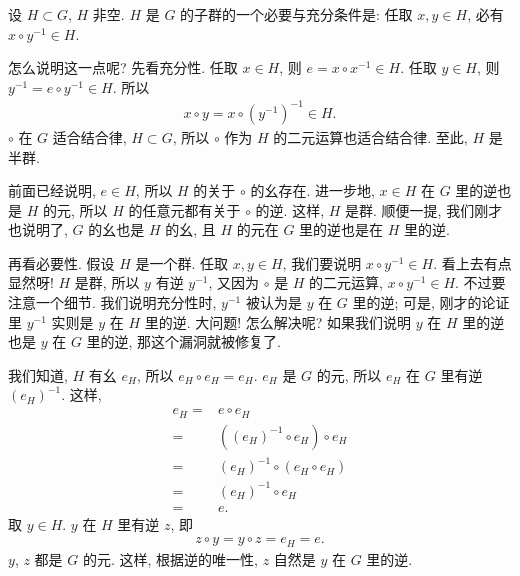 \begin{remark}
    设 $H \subset G$, $H$ 非空. $H$ 是 $G$ 的子群的一个必要与充分条件是: 任取 $x,y \in H$, 必有 $x \circ y^{-1} \in H$.

    怎么说明这一点呢? 先看充分性. 任取 $x \in H$, 则 $e = x \circ x^{-1} \in H$. 任取 $y \in H$, 则 $y^{-1} = e \circ y^{-1} \in H$. 所以
    \begin{align*}
        x \circ y = x \circ (y^{-1})^{-1} \in H.
    \end{align*}
    $\circ$ 在 $G$ 适合结合律, $H \subset G$, 所以 $\circ$ 作为 $H$ 的二元运算也适合结合律. 至此, $H$ 是半群.

    前面已经说明, $e \in H$, 所以 $H$ 的关于 $\circ$ 的幺存在. 进一步地, $x \in H$ 在 $G$ 里的逆也是 $H$ 的元, 所以 $H$ 的任意元都有关于 $\circ$ 的逆. 这样, $H$ 是群. 顺便一提, 我们刚才也说明了, $G$ 的幺也是 $H$ 的幺, 且 $H$ 的元在 $G$ 里的逆也是在 $H$ 里的逆.

    再看必要性. 假设 $H$ 是一个群. 任取 $x,y \in H$, 我们要说明 $x \circ y^{-1} \in H$. 看上去有点显然呀! $H$ 是群, 所以 $y$ 有逆 $y^{-1}$, 又因为 $\circ$ 是 $H$ 的二元运算, $x \circ y^{-1} \in H$. 不过要注意一个细节. 我们说明充分性时, $y^{-1}$ 被认为是 $y$ 在 $G$ 里的逆; 可是, 刚才的论证里 $y^{-1}$ 实则是 $y$ 在 $H$ 里的逆. 大问题! 怎么解决呢? 如果我们说明 $y$ 在 $H$ 里的逆也是 $y$ 在 $G$ 里的逆, 那这个漏洞就被修复了.

    我们知道, $H$ 有幺 $e_H$, 所以 $e_H \circ e_H = e_H$. $e_H$ 是 $G$ 的元, 所以 $e_H$ 在 $G$ 里有逆 $(e_H)^{-1}$. 这样,
    \begin{align*}
        e_H
        = {} & e \circ e_H                      \\
        = {} & ((e_H)^{-1} \circ e_H) \circ e_H \\
        = {} & (e_H)^{-1} \circ (e_H \circ e_H) \\
        = {} & (e_H)^{-1} \circ e_H             \\
        = {} & e.
    \end{align*}
    取 $y \in H$. $y$ 在 $H$ 里有逆 $z$, 即
    \begin{align*}
        z \circ y = y \circ z = e_H = e.
    \end{align*}
    $y$, $z$ 都是 $G$ 的元. 这样, 根据逆的唯一性, $z$ 自然是 $y$ 在 $G$ 里的逆.
\end{remark}

\subsubsection*{\AdditiveGroups}

